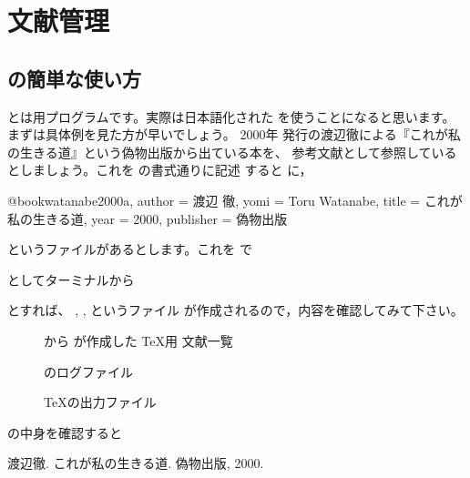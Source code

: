 ﻿%
\chapter{文献管理}

\begin{abstract}
 
\end{abstract}

\section{\BibTeX の簡単な使い方}

\BibTeX とは用プログラムです。実際は日本語化された \JBibTeX
を使うことになると思います。まずは具体例を見た方が早いでしょう。 2000年
発行の渡辺徹による『これが私の生きる道』という偽物出版から出ている本を、
参考文献として参照しているとしましょう。これを \JBibTeX の書式通りに記述
すると に，
\begin{InText}
@book{watanabe2000a,
  author    = {渡辺 徹},
  yomi      = {Toru Watanabe},
  title     = {これが私の生きる道},
  year      = {2000},
  publisher = {偽物出版}
 }
\end{InText}
というファイルがあるとします。これを  で


としてターミナルから
\begin{InTerm}
  
  
  
  
\end{InTerm}

とすれば、 , ,  というファイル
が作成されるので，内容を確認してみて下さい。

\begin{description}
 \item[]
     から \JBibTeX が作成した \TeX 用 文献一覧
 \item[]
    \JBibTeX のログファイル
 \item[]
    \TeX の出力ファイル
\end{description}

 の中身を確認すると
\begin{InText}
 \begin{thebibliography}{1}
 渡辺徹. \newblock これが私の生きる道. \newblock 偽物出版, 2000.
 \end{thebibliography}
\end{InText}

